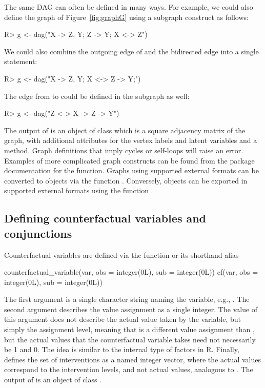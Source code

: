 The same DAG can often be defined in many ways. For example, we could also define the graph of Figure~\ref{fig:graphG} using a subgraph construct as follows:
\begin{example}
R> g <- dag("X -> {Z, Y}; Z -> Y; X <-> Z")
\end{example}
We could also combine the outgoing edge of  and the bidirected edge into a single statement:
\begin{example}
R> g <- dag("X -> {Z, Y}; X <-> Z -> Y;")
\end{example}
The edge from  to  could be defined in the subgraph as well:
\begin{example}
R> g <- dag("Z <-> X -> {Z -> Y}")
\end{example}
The output of  is an object of class  which is a square adjacency matrix of the graph, with additional attributes for the vertex labels and latent variables and a  method. Graph definitions that imply cycles or self-loops will raise an error. Examples of more complicated graph constructs can be found from the  package documentation for the  function. Graphs using supported external formats can be converted to  objects via the function . Conversely,  objects can be exported in supported external formats using the function .

\subsection{Defining counterfactual variables and conjunctions} \label{sec:cfs}

Counterfactual variables are defined via the function  or its shorthand alias 
\begin{example}
counterfactual_variable(var, obs = integer(0L), sub = integer(0L))
cf(var, obs = integer(0L), sub = integer(0L))
\end{example}
The first argument  is a single character string naming the variable, e.g., . The second argument  describes the value assignment as a single integer. The value of this argument does not describe the actual value taken by the variable, but simply the assignment level, meaning that  is a different value assignment than , but the actual values that the counterfactual variable takes need not necessarily be 1 and 0. The idea is similar to the internal type of factors in R. Finally,  defines the set of interventions as a named integer vector, where the actual values correspond to the intervention levels, and not actual values, analogous to . The output of  is an object of class .

